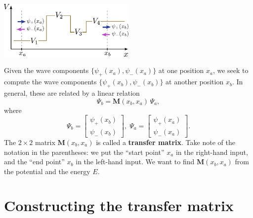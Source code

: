 \documentclass[pra,12pt]{revtex4}
\begin{document}
\begin{center}
  \includegraphics[width=0.5\textwidth]{transfer_matrix_setup}
\end{center}

\noindent
Given the wave components $\{\psi_+(x_a),\psi_-(x_a)\}$ at one
position $x_a$, we seek to compute the wave components
$\{\psi_+(x_b),\psi_-(x_b)\}$ at another position $x_b$.  In general,
these are related by a linear relation
\begin{equation}
  \Psi_b = \mathbf{M}(x_b,x_a) \, \Psi_a,
\end{equation}
where
\begin{equation}
  \Psi_b = \begin{bmatrix}\psi_+(x_b) \\ \psi_-(x_b)\end{bmatrix}, \; \Psi_a = \begin{bmatrix}\psi_+(x_a) \\ \psi_-(x_a)\end{bmatrix}.
\end{equation}
The $2\times2$ matrix $\mathbf{M}(x_b,x_a)$ is called a
\textbf{transfer matrix}.  Take note of the notation in the
parentheses: we put the ``start point'' $x_a$ in the right-hand input,
and the ``end point'' $x_b$ in the left-hand input.  We want to find
$\mathbf{M}(x_b,x_a)$ from the potential and the energy $E$.

\section{Constructing the transfer matrix}
\end{document}
